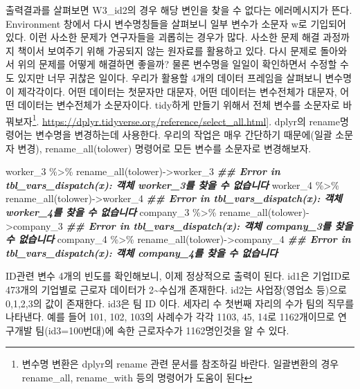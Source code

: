 \documentclass[
]{book}
\newenvironment{Shaded}{\begin{snugshade}}{\end{snugshade}}
\newcommand{\DocumentationTok}[1]{\textcolor[rgb]{0.56,0.35,0.01}{\textbf{\textit{#1}}}}
\newcommand{\FunctionTok}[1]{\textcolor[rgb]{0.00,0.00,0.00}{#1}}
\newcommand{\NormalTok}[1]{#1}
\newcommand{\OtherTok}[1]{\textcolor[rgb]{0.56,0.35,0.01}{#1}}
\newcommand{\SpecialCharTok}[1]{\textcolor[rgb]{0.00,0.00,0.00}{#1}}
\theoremstyle{definition}
\theoremstyle{definition}
\theoremstyle{definition}
\theoremstyle{definition}
\theoremstyle{remark}
\begin{document}
출력결과를 살펴보면 W3\_id2의 경우 해당 변인을 찾을 수 없다는 에러메시지가 뜬다. Environment 창에서 다시 변수명칭들을 살펴보니 일부 변수가 소문자 w로 기입되어 있다. 이런 사소한 문제가 연구자들을 괴롭히는 경우가 많다. 사소한 문제 해결 과정까지 책이서 보여주기 위해 가공되지 않는 원자료를 활용하고 있다. 다시 문제로 돌아와서 위의 문제를 어떻게 해결하면 좋을까? 물론 변수명을 일일이 확인하면서 수정할 수도 있지만 너무 귀찮은 일이다. 우리가 활용할 4개의 데이터 프레임을 살펴보니 변수명이 제각각이다. 어떤 데이터는 첫문자만 대문자, 어떤 데이터는 변수전체가 대문자, 어떤 데이터는 변수전체가 소문자이다. tidy하게 만들기 위해서 전체 변수를 소문자로 바꿔보자\footnote{변수명 변환은 dplyr의 rename 관련 문서를 참조하길 바란다. 일괄변환의 경우 rename\_all, rename\_with 등의 명령어가 도움이 된다}. \url{https://dplyr.tidyverse.org/reference/select_all.html}{]}. dplyr의 rename명령어는 변수명을 변경하는데 사용한다. 우리의 작업은 매우 간단하기 때문에(일괄 소문자 변경), rename\_all(tolower) 명령어로 모든 변수를 소문자로 변경해보자.

\begin{Shaded}
\begin{Highlighting}[]
\NormalTok{worker\_3 }\SpecialCharTok{\%\textgreater{}\%} 
  \FunctionTok{rename\_all}\NormalTok{(tolower)}\OtherTok{{-}\textgreater{}}\NormalTok{worker\_3}
\DocumentationTok{\#\# Error in tbl\_vars\_dispatch(x): 객체 \textquotesingle{}worker\_3\textquotesingle{}를 찾을 수 없습니다}
\NormalTok{worker\_4 }\SpecialCharTok{\%\textgreater{}\%} 
  \FunctionTok{rename\_all}\NormalTok{(tolower)}\OtherTok{{-}\textgreater{}}\NormalTok{worker\_4}
\DocumentationTok{\#\# Error in tbl\_vars\_dispatch(x): 객체 \textquotesingle{}worker\_4\textquotesingle{}를 찾을 수 없습니다}
\NormalTok{company\_3 }\SpecialCharTok{\%\textgreater{}\%} 
  \FunctionTok{rename\_all}\NormalTok{(tolower)}\OtherTok{{-}\textgreater{}}\NormalTok{company\_3}
\DocumentationTok{\#\# Error in tbl\_vars\_dispatch(x): 객체 \textquotesingle{}company\_3\textquotesingle{}를 찾을 수 없습니다}
\NormalTok{company\_4 }\SpecialCharTok{\%\textgreater{}\%} 
  \FunctionTok{rename\_all}\NormalTok{(tolower)}\OtherTok{{-}\textgreater{}}\NormalTok{company\_4}
\DocumentationTok{\#\# Error in tbl\_vars\_dispatch(x): 객체 \textquotesingle{}company\_4\textquotesingle{}를 찾을 수 없습니다}
\end{Highlighting}
\end{Shaded}

ID관련 변수 4개의 빈도를 확인해보니, 이제 정상적으로 출력이 된다. id1은 기업ID로 473개의 기업별로 근로자 데이터가 2\textasciitilde 수십개 존재한다. id2는 사업장(영업소 등)으로 0,1,2,3의 값이 존재한다. id3은 팀 ID 이다. 세자리 수 첫번째 자리의 수가 팀의 직무를 나타낸다. 예를 들어 101, 102, 103의 사례수가 각각 1103, 45, 14로 1162개이므로 연구개발 팀(id3=100번대)에 속한 근로자수가 1162명인것을 알 수 있다.
\end{document}
